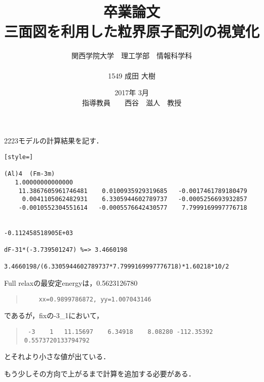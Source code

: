 \documentclass[12pt,a4paper]{jsarticle}
\begin{document}
\title{卒業論文\\
\vspace{4cm} 三面図を利用した粒界原子配列の視覚化}
\author{ 関西学院大学　理工学部　情報科学科\\\\1549 成田 大樹}
\date{\vspace{3cm} 2017年  3月\\
\vspace{3cm} 指導教員　　西谷　滋人　教授}
\maketitle
\tableofcontents

\tableofcontents









2223モデルの計算結果を記す．
\begin{lstlisting}[style=]

(Al)4  (Fm-3m)
   1.00000000000000
    11.3867605961746481    0.0100935929319685   -0.0017461789180479
     0.0041105062482931    6.3305944602789737   -0.0005256693932857
    -0.0010552304551614   -0.0005576642430577    7.7999169997776718


-0.112458518905E+03

dF-31*(-3.739501247) %=> 3.4660198

3.4660198/(6.3305944602789737*7.7999169997776718)*1.60218*10/2
\end{lstlisting}
Full relaxの最安定energyは，0.5623126780
\begin{quote}\begin{verbatim}
    xx=0.9899786872, yy=1.007043146
\end{verbatim}\end{quote}
であるが，fixの-3\_1において，
\begin{quote}\begin{verbatim}
 -3    1   11.15697    6.34918    8.08280 -112.35392 0.5573720133794792
\end{verbatim}\end{quote}
とそれより小さな値が出ている．

もう少しその方向で上がるまで計算を追加する必要がある．
\end{document}
